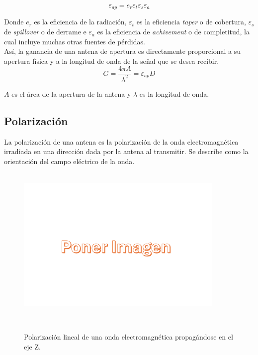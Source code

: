 \begin{equation}
    \varepsilon_{ap} = e_{r} \varepsilon_{t} \varepsilon_{s} \varepsilon_{a}
\end{equation}

Donde $e_{r}$ es la eficiencia de la radiación, $\varepsilon_{t}$ es la eficiencia \textit{taper} o de cobertura, $\varepsilon_{s}$ de \textit{spillover} o de derrame e $\varepsilon_{a}$ es la eficiencia de \textit{achivement} o de completitud, la cual incluye muchas otras fuentes de pérdidas.\\

Así, la ganancia de una antena de apertura es directamente proporcional a su apertura física y a la longitud de onda de la señal que se desea recibir.\\

\begin{equation}
    G = \frac{4\pi A}{\lambda^{2}} = \varepsilon_{ap} D
\end{equation}

$A$ es el área de la apertura de la antena y $\lambda$ es la longitud de onda.\\

\subsection{Polarización}

La polarización de una antena es la polarización de la onda electromagnética irradiada en una dirección dada por la antena al transmitir. Se describe como la orientación del campo eléctrico de la onda.\\

\begin{figure}
    \centering
    \includegraphics[width = 10cm]{img/imagen.png}
    \caption{Polarización lineal de una onda electromagnética propagándose en el eje Z.}
    \label{fig:polarización}
\end{figure}

